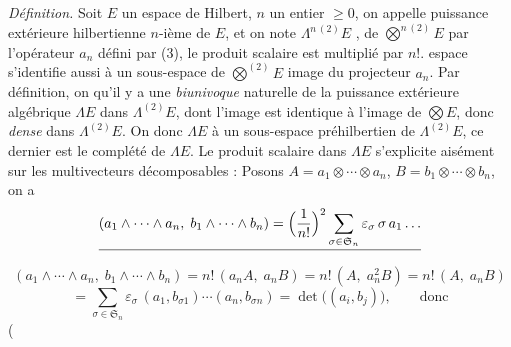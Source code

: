 \documentclass[11pt,a4paper]{article}
\begin{document}
\emph{Définition.} Soit $E$ un espace de Hilbert, $n$ un entier $\geq 0$, on appelle puissance extérieure hilbertienne $n$-ième de $E$, et on note $\Lambda^{n\,(2)} E$ , \struck{\ill{}}   de $\bigotimes^{n\,(2)} E$ par l'opérateur $a_n$ défini par (3),   le produit scalaire est multiplié par $n!$.  espace s'identifie aussi  \struck{\ill{}} à un sous-espace de $\bigotimes^{(2)} E$ image du projecteur $a_n$. Par définition, on  qu'il y a une  \emph{biunivoque} naturelle de la puissance extérieure algébrique $\Lambda E$ dans $\Lambda^{(2)} E$, dont l'image est identique à l'image de $\bigotimes E$, donc \emph{dense} dans $\Lambda^{(2)} E$. On  donc $\Lambda E$ à un sous-espace préhilbertien de $\Lambda^{(2)} E$,  ce dernier est le complété de $\Lambda E$. Le produit scalaire dans $\Lambda E$ s'explicite aisément \struck{\ill{}} sur les \struck{\ill{}} multivecteurs décomposables  : Posons $A = a_1 \otimes \cdots \otimes a_n$, $B = b_1 \otimes \cdots \otimes b_n$, on a
\[
  \struck{(a_1 \wedge \cdots \wedge a_n,\; b_1 \wedge \cdots \wedge b_n) = \Bigl(\frac{1}{n!}\Bigr)^{2} \sum_{\sigma \in \mathfrak{S}_n} \varepsilon_\sigma\, \sigma\, a_1 \ldots}
\]
\[
  (a_1 \wedge \cdots \wedge a_n,\; b_1 \wedge \cdots \wedge b_n) = n!\,(a_n A,\; a_n B) = n!\,(A,\; a_n^{2} B) = n!\,(A,\; a_n B)
\]
\[
  = \sum_{\sigma \in \mathfrak{S}_n} \varepsilon_\sigma\, (a_1, b_{\sigma 1}) \cdots (a_n, b_{\sigma n}) = \det\bigl((a_i, b_j)\bigr), \qquad \text{donc}
\]
\ill{} \struck{\ill{}} \ill{} (
\end{document}
